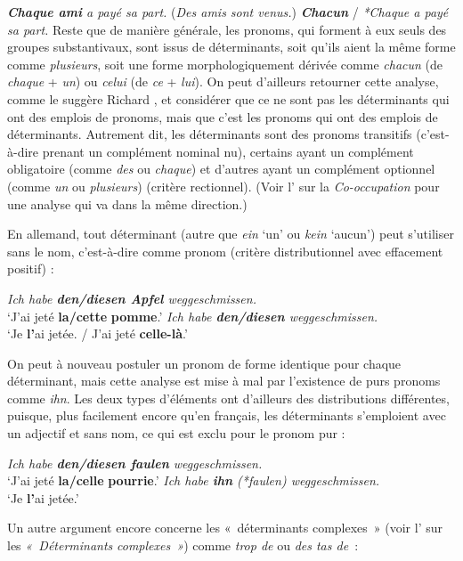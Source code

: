 \ea \textit{\textbf{{Chaque ami}}  {a payé sa part.}}
\ex (\textit{{Des amis sont venus.}}) \textit{\textbf{{Chacun} }}{/}  \textit{{*Chaque a payé sa part.}}
\z
Reste que de manière générale, les pronoms, qui forment à eux seuls des groupes substantivaux, sont issus de déterminants, soit qu’ils aient la même forme comme \textit{plusieurs}, soit une forme morphologiquement dérivée comme \textit{chacun} (de \textit{chaque} + \textit{un}) ou \textit{celui} (de \textit{ce} + \textit{lui}). On peut d’ailleurs retourner cette analyse, comme le suggère Richard \citet[192]{hudson2006language}, et considérer que ce ne sont pas les déterminants qui ont des emplois de pronoms, mais que c’est les pronoms qui ont des emplois de déterminants. Autrement dit, les déterminants sont des pronoms transitifs (c’est-à-dire prenant un complément nominal nu), certains ayant un complément obligatoire (comme \textit{des} ou \textit{chaque}) et d’autres ayant un complément optionnel (comme \textit{un} ou \textit{plusieurs}) (critère rectionnel). (Voir l’ sur la \textit{Co-occupation} pour une analyse qui va dans la même direction.)

En allemand, tout déterminant (autre que \textit{ein} ‘un’ ou \textit{kein} ‘aucun’) peut s’utiliser sans le nom, c’est-à-dire comme pronom (critère distributionnel avec effacement positif) :

\ea \textit{{Ich habe} \textbf{{den/diesen}  {Apfel}}  {weggeschmissen.}}\\
\glt ‘J’ai jeté \textbf{la/cette} \textbf{pomme}.’
\ex \textit{{Ich habe} \textbf{{den/diesen}}  {weggeschmissen.}}\\
\glt ‘Je \textbf{l’}ai jetée. / J’ai jeté \textbf{celle-là}.’
\z

On peut à nouveau postuler un pronom de forme identique pour chaque déterminant, mais cette analyse est mise à mal par l’existence de purs pronoms comme \textit{ihn}. Les deux types d’éléments ont d’ailleurs des distributions différentes, puisque, plus facilement encore qu’en français, les déterminants s’emploient avec un adjectif et sans nom, ce qui est exclu pour le pronom pur :

\ea \textit{{Ich habe} \textbf{{den/diesen}  {faulen} } {weggeschmissen.}}\\
\glt ‘J’ai jeté \textbf{la/celle} \textbf{pourrie}.’
\ex \textit{{Ich habe} \textbf{{ihn}} (*{faulen})  {weggeschmissen.}}\\
\glt ‘Je \textbf{l’}ai jetée.’
\z

Un autre argument encore concerne les «~déterminants complexes~» (voir l’ sur les \textit{«~Déterminants} \textit{complexes~»}) comme \textit{trop de} ou \textit{des tas de~}:

